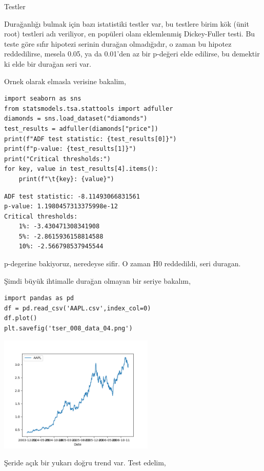 \documentclass[12pt,fleqn]{article}\usepackage{../../common}
\begin{document}
Testler

Durağanlığı bulmak için bazı istatistiki testler var, bu testlere birim kök
(ünit root) testleri adı veriliyor, en popüleri olanı eklemlenmiş Dickey-Fuller
testi. Bu teste göre sıfır hipotezi serinin durağan olmadığıdır, o zaman bu
hipotez reddedilirse, mesela 0.05, ya da 0.01'den az bir p-değeri elde edilirse,
bu demektir ki elde bir durağan seri var. 

Ornek olarak elmasla verisine bakalim,

\begin{verbatim}
import seaborn as sns
from statsmodels.tsa.stattools import adfuller
diamonds = sns.load_dataset("diamonds")
test_results = adfuller(diamonds["price"])
print(f"ADF test statistic: {test_results[0]}")
print(f"p-value: {test_results[1]}")
print("Critical thresholds:")
for key, value in test_results[4].items():
    print(f"\t{key}: {value}")
\end{verbatim}

\begin{verbatim}
ADF test statistic: -8.11493066831561
p-value: 1.1980457313375998e-12
Critical thresholds:
	1%: -3.430471308341908
	5%: -2.8615936158814588
	10%: -2.566798537945544
\end{verbatim}

p-degerine bakiyoruz, neredeyse sifir. O zaman H0 reddedildi, seri duragan.

Şimdi büyük ihtimalle durağan olmayan bir seriye bakalım,

\begin{verbatim}
import pandas as pd
df = pd.read_csv('AAPL.csv',index_col=0)
df.plot()
plt.savefig('tser_008_data_04.png')
\end{verbatim}

\includegraphics[width=20em]{tser_008_data_04.png}

Şeride açık bir yukarı doğru trend var. Test edelim,
\end{document}
